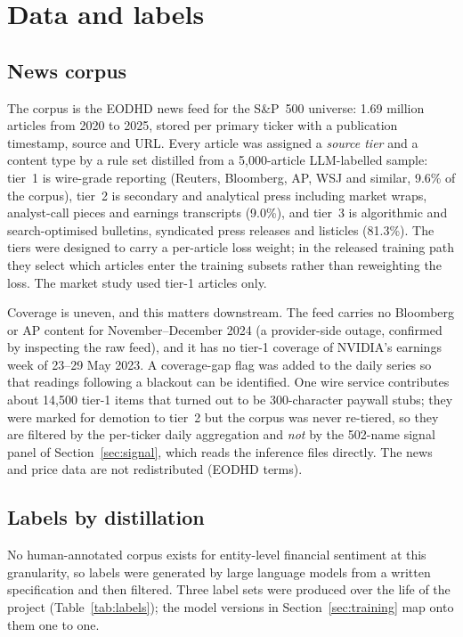 \documentclass[11pt,letterpaper]{article}
\begin{document}
\section{Data and labels}
\label{sec:data}

\subsection{News corpus}

The corpus is the EODHD news feed for the S\&P~500 universe: 1.69 million articles from 2020 to
2025, stored per primary ticker with a publication timestamp, source and URL. Every article was
assigned a \emph{source tier} and a content type by a rule set distilled from a 5{,}000-article
LLM-labelled sample: tier~1 is wire-grade reporting (Reuters, Bloomberg, AP, WSJ and similar, 9.6\% of the
corpus), tier~2 is secondary and analytical press including market wraps, analyst-call pieces and
earnings transcripts (9.0\%), and tier~3 is algorithmic and search-optimised bulletins,
syndicated press releases and listicles (81.3\%). The tiers were designed to carry a
per-article loss weight; in the released training path they select which articles enter the
training subsets rather than reweighting the loss. The market study used tier-1 articles only.

Coverage is uneven, and this matters downstream. The feed carries no Bloomberg or AP content for
November--December 2024 (a provider-side outage, confirmed by inspecting the raw feed), and it
has no tier-1 coverage of NVIDIA's earnings week of 23--29 May 2023. A coverage-gap flag was
added to the daily series so that readings following a blackout can be identified. One wire
service contributes about 14{,}500 tier-1 items that turned out to be 300-character paywall
stubs; they were marked for demotion to tier~2 but the corpus was never re-tiered, so they are
filtered by the per-ticker daily aggregation and \emph{not} by the 502-name signal panel of
Section~\ref{sec:signal}, which reads the inference files directly. The news and price data are
not redistributed (EODHD terms).

\subsection{Labels by distillation}

No human-annotated corpus exists for entity-level financial sentiment at this granularity, so
labels were generated by large language models from a written specification and then filtered.
Three label sets were produced over the life of the project (Table~\ref{tab:labels}); the model
versions in Section~\ref{sec:training} map onto them one to one.
\end{document}
